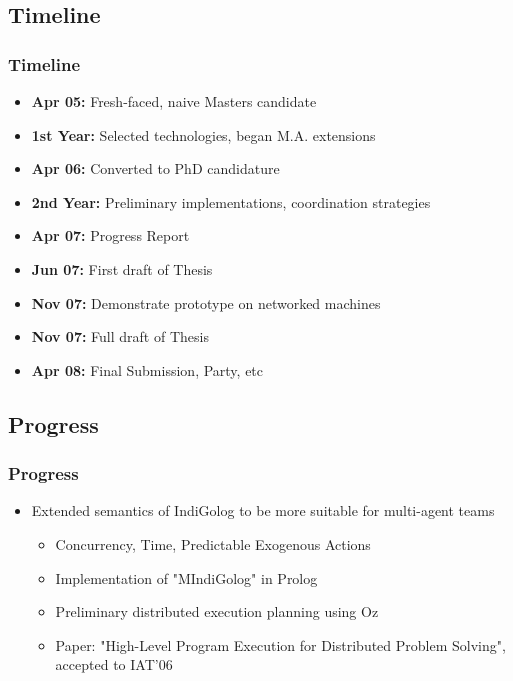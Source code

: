 \documentclass[compress]{beamer}
\begin{document}
\subsection{Timeline}

\begin{frame}
\frametitle{Timeline}
\begin{itemize}
\item \textbf{Apr 05:} Fresh-faced, naive Masters candidate
\item \textbf{1st Year:} Selected technologies, began M.A. extensions
\item<2-> \textbf{Apr 06:} Converted to PhD candidature
\item<2-> \textbf{2nd Year:} Preliminary implementations, coordination strategies
\item<3-> \textbf{Apr 07:} Progress Report
\item<3-> \textbf{Jun 07:} First draft of Thesis
\item<3-> \textbf{Nov 07:} Demonstrate prototype on networked machines
\item<3-> \textbf{Nov 07:} Full draft of Thesis
\item<4-> \textbf{Apr 08:} Final Submission, Party, etc
\end{itemize}
\end{frame}

\subsection{Progress}

\begin{frame}
\frametitle{Progress}
\begin{itemize}
\item Extended semantics of IndiGolog to be more suitable for multi-agent teams
  \begin{itemize}
  \item Concurrency, Time, Predictable Exogenous Actions
  \item Implementation of "MIndiGolog" in Prolog
  \item Preliminary distributed execution planning using Oz
  \item Paper: "High-Level Program Execution for Distributed Problem Solving", accepted to IAT'06
  \end{itemize}
\end{itemize}
\end{frame}
\end{document}
